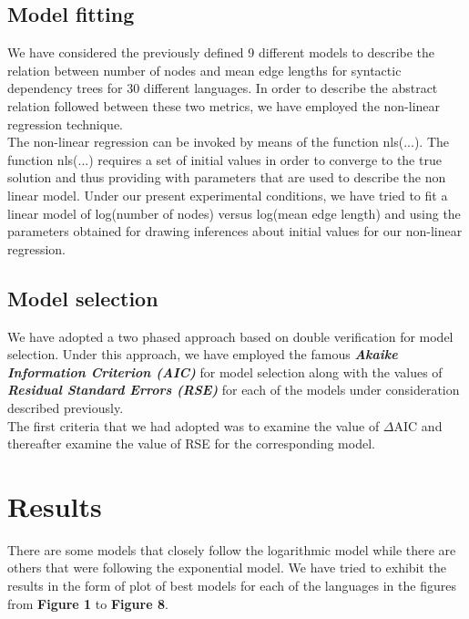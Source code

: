 \documentclass[a4paper]{article}
\begin{document}
\subsection{Model fitting}
We have considered the previously defined 9 different models to describe the relation between number of nodes and mean edge lengths for syntactic dependency trees for 30 different languages. In order to describe the abstract relation followed between these two metrics, we have employed the non-linear regression technique. 
\\
The non-linear regression can be invoked by means of the function nls(...). The function nls(...) requires a set of initial values in order to converge to the true solution and thus providing with parameters that are used to describe the non linear model. Under our present experimental conditions, we have tried to fit a linear model of log(number of nodes) versus log(mean edge length) and using the parameters obtained for drawing inferences about initial values for our non-linear regression.

\subsection{Model selection}
We have adopted a two phased approach based on double verification for model selection. Under this approach, we have employed the famous \textbf{\textit{Akaike Information Criterion (AIC)}} for model selection along with the values of \textbf{\textit{Residual Standard Errors (RSE)}} for each of the models under consideration described previously. 
\\
The first criteria that we had adopted was to examine the value of $\Delta$AIC and thereafter examine the value of RSE for the corresponding model. 


\section{Results}
There are some models that closely follow the logarithmic model while there are others that were following the exponential model. We have tried to exhibit the results in the form of plot of best models for each of the languages in the figures from \textbf{Figure 1} to \textbf{Figure 8}. 
\end{document}
